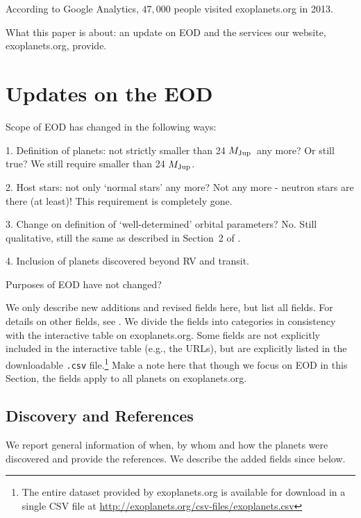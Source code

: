 \documentclass[11pt,preprint]{aastex}
\def\mjup{$M_{\rm Jup}$}
\begin{document}
\begin{CJK*}{UTF8}{gbsn}


According to Google Analytics, $47,000$ people visited exoplanets.org
in 2013.

What this paper is about: an update on EOD and the services our
website, exoplanets.org, provide.




\section{Updates on the EOD}\label{sec:update}

Scope of EOD has changed in the following ways:

1. Definition of planets: not strictly smaller than 24 \mjup\ any
more? Or still true? We still require smaller than 24 \mjup.

2. Host stars: not only `normal stars' any more? Not any more -
neutron stars are there (at least)! This requirement is completely gone.

3. Change on definition of `well-determined' orbital parameters? No. Still
qualitative, still the same as described in Section~2 of \cite{Wright2011}.

4. Inclusion of planets discovered beyond RV and transit.

Purposes of EOD have not changed?

We only describe new additions and revised fields here, but list all
fields. For details on other fields, see \cite{Wright2011}. We divide
the fields into categories in consistency with the interactive table
on exoplanets.org. Some fields are not explicitly included in the
interactive table (e.g., the URLs), but are explicitly listed in the
downloadable {\tt .csv} file.\footnote{The entire dataset provided by
  exoplanets.org is available for download in a single CSV file at
  \url{http://exoplanets.org/csv-files/exoplanets.csv}} Make a note
here that though we focus on EOD in this Section, the fields apply to
all planets on exoplanets.org.

\subsection{Discovery and References}

We report general information of when, by whom and how the planets were
discovered and provide the references. We describe the added fields since \cite{Wright2011} below. \\


\end{CJK*}
\end{document}
